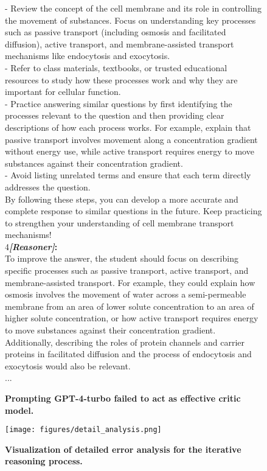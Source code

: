 \begin{figure*}
\begin{tcolorbox}[
    colback=gray!10,      %
    colframe=gray!80,     %
    title=Case Study 2,
    fonttitle=\bfseries,  %
    rounded corners,
    boxrule=0.5mm,        %
    width=\linewidth
]
   - Review the concept of the cell membrane and its role in controlling the movement of substances. Focus on understanding key processes such as passive transport (including osmosis and facilitated diffusion), active transport, and membrane-assisted transport mechanisms like endocytosis and exocytosis.  \\
   - Refer to class materials, textbooks, or trusted educational resources to study how these processes work and why they are important for cellular function.  \\
   - Practice answering similar questions by first identifying the processes relevant to the question and then providing clear descriptions of how each process works. For example, explain that passive transport involves movement along a concentration gradient without energy use, while active transport requires energy to move substances against their concentration gradient.  \\
   - Avoid listing unrelated terms and ensure that each term directly addresses the question.  \\
   By following these steps, you can develop a more accurate and complete response to similar questions in the future. Keep practicing to strengthen your understanding of cell membrane transport mechanisms!\\
\textcircled{\raisebox{-0.3pt} {\scriptsize4}}\textbf{\emph{[Reasoner]}:}\\
To improve the answer, the student should focus on describing specific processes such as passive transport, active transport, and membrane-assisted transport. For example, they could explain how osmosis involves the movement of water across a semi-permeable membrane from an area of lower solute concentration to an area of higher solute concentration, or how active transport requires energy to move substances against their concentration gradient. Additionally, describing the roles of protein channels and carrier proteins in facilitated diffusion and the process of endocytosis and exocytosis would also be relevant.\\
...
\end{tcolorbox}
\caption{\textbf{Prompting GPT-4-turbo failed to act as effective critic model.}}
\label{box:error_gpt4o}
\end{figure*}

\begin{figure*}[!t]
\centering
\texttt{[image: figures/detail\_analysis.png]}
\caption{\small \textbf{Visualization of detailed error analysis for the iterative reasoning process.}}
\label{fig:further_error_analysis}
\end{figure*}

